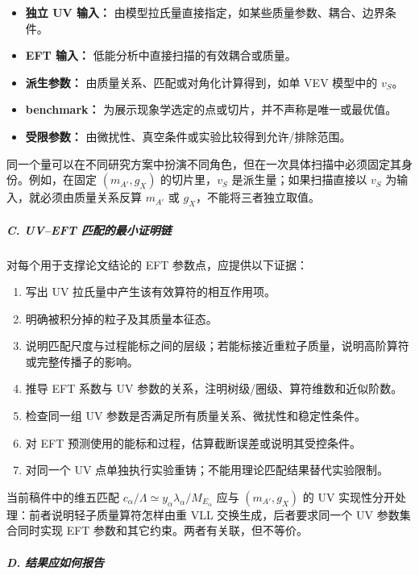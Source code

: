 \documentclass[
]{article}
\providecommand{\tightlist}{%
  \setlength{\itemsep}{0pt}\setlength{\parskip}{0pt}}
\begin{document}
\begin{itemize}
\tightlist
\item
  \textbf{独立 UV 输入：}
  由模型拉氏量直接指定，如某些质量参数、耦合、边界条件。
\item
  \textbf{EFT 输入：} 低能分析中直接扫描的有效耦合或质量。
\item
  \textbf{派生参数：} 由质量关系、匹配或对角化计算得到，如单 VEV
  模型中的 \(v_S\)。
\item
  \textbf{benchmark：}
  为展示现象学选定的点或切片，并不声称是唯一或最优值。
\item
  \textbf{受限参数：} 由微扰性、真空条件或实验比较得到允许/排除范围。
\end{itemize}

同一个量可以在不同研究方案中扮演不同角色，但在一次具体扫描中必须固定其身份。例如，在固定
\((m_{A'},g_X)\) 的切片里，\(v_S\) 是派生量；如果扫描直接以 \(v_S\)
为输入，就必须由质量关系反算 \(m_{A'}\) 或 \(g_X\)，不能将三者独立取值。

\subparagraph{C. UV--EFT
匹配的最小证明链}\label{c.-uveft-ux5339ux914dux7684ux6700ux5c0fux8bc1ux660eux94fe}

对每个用于支撑论文结论的 EFT 参数点，应提供以下证据：

\begin{enumerate}
\def\labelenumi{\arabic{enumi}.}
\tightlist
\item
  写出 UV 拉氏量中产生该有效算符的相互作用项。
\item
  明确被积分掉的粒子及其质量本征态。
\item
  说明匹配尺度与过程能标之间的层级；若能标接近重粒子质量，说明高阶算符或完整传播子的影响。
\item
  推导 EFT 系数与 UV 参数的关系，注明树级/圈级、算符维数和近似阶数。
\item
  检查同一组 UV 参数是否满足所有质量关系、微扰性和稳定性条件。
\item
  对 EFT 预测使用的能标和过程，估算截断误差或说明其受控条件。
\item
  对同一个 UV 点单独执行实验重铸；不能用理论匹配结果替代实验限制。
\end{enumerate}

当前稿件中的维五匹配
\(c_\alpha/\Lambda\simeq y_\alpha\lambda_\alpha/M_{E_\alpha}\) 应与
\((m_{A'},g_X)\) 的 UV 实现性分开处理：前者说明轻子质量算符怎样由重 VLL
交换生成，后者要求同一个 UV 参数集合同时实现 EFT
参数和其它约束。两者有关联，但不等价。

\subparagraph{D.
结果应如何报告}\label{d.-ux7ed3ux679cux5e94ux5982ux4f55ux62a5ux544a}
\end{document}

